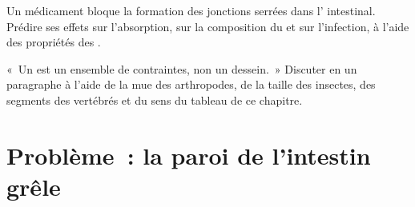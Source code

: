 \begin{exercise}[$\star\star\star$]\label{exo:b1:body-plans-tissues:11}
Un médicament bloque la formation des jonctions serrées dans
l' intestinal. Prédire ses effets sur l'absorption, sur la
composition du  et sur l'infection, à l'aide des
propriétés des .
\end{exercise}

\begin{exercise}[$\star\star\star$]\label{exo:b1:body-plans-tissues:12}
«~Un  est un ensemble de contraintes, non un
dessein.~» Discuter en un paragraphe à l'aide de la mue des arthropodes,
de la taille des insectes, des segments des vertébrés et du sens du
tableau de ce chapitre.
\end{exercise}

\section{Problème~: la paroi de l'intestin grêle}

